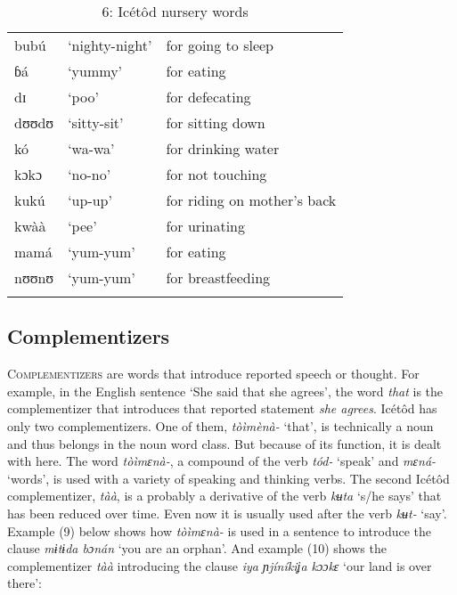 \begin{table}
\caption{6: Icétôd nursery words}
\label{tab:3}


\begin{tabularx}{\textwidth}{XXX}
\lsptoprule

bubú & ‘nighty-night’ & for going to sleep\\
ɓá & ‘yummy’ & for eating\\
dɪ & ‘poo’ & for defecating\\
dʊʊdʊ & ‘sitty-sit’ & for sitting down\\
kó & ‘wa-wa’ & for drinking water\\
kɔkɔ & ‘no-no’ & for not touching\\
kukú & ‘up-up’ & for riding on mother’s back\\
kwàà & ‘pee’ & for urinating\\
mamá & ‘yum-yum’ & for eating\\
nʊʊnʊ & ‘yum-yum’ & for breastfeeding\\
\lspbottomrule
\end{tabularx}
\end{table}



\subsection{Complementizers}


\textsc{Complementizers} are words that introduce reported speech or thought. For example, in the English sentence ‘She said that she agrees’, the word \textit{that} is the complementizer that introduces that reported statement \textit{she agrees}. Icétôd has only two complementizers. One of them, \textit{tòìmènà-} ‘that’, is technically a noun and thus belongs in the noun word class. But because of its function, it is dealt with here. The word \textit{tòìmɛnà-}, a compound of the verb \textit{tód-} ‘speak’ and \textit{mɛná-} ‘words’, is used with a variety of speaking and thinking verbs. The second Icétôd complementizer, \textit{tàà}, is a probably a derivative of the verb \textit{kʉta} ‘s/he says’ that has been reduced over time. Even now it is usually used after the verb \textit{kʉt-} ‘say’. Example (9) below shows how \textit{tòìmɛnà-} is used in a sentence to introduce the clause \textit{mɨtɨda bɔnán} ‘you are an orphan’. And example (10) shows the complementizer \textit{tàà} introducing the clause \textit{iya ɲjíníkiʝa kɔɔkɛ} ‘our land is over there’:




